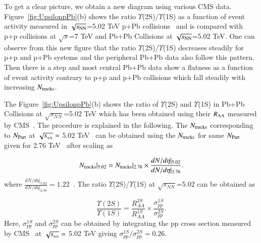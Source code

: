 To get a clear picture, we obtain a new diagram using various CMS data.
Figure~\ref{fig:UpsilonpPb}(b) shows the ratio $\Upsilon$(2S)/$\Upsilon$(1S) as a function of
event activity measured in $\sqrt{s_{\rm NN}}$=5.02 TeV p+Pb collisions~\cite{CMS:2013jsu}
and is compared with p+p collisions at $\sqrt{s}$=7 TeV \cite{CMS:2020fae} and
Pb+Pb Collisions at $\sqrt{s_{\rm NN}}$=5.02 TeV. One can observe from this new figure
that the ratio $\Upsilon$(2S)/$\Upsilon$(1S) decreases steadily for p+p and p+Pb systems
and the peripheral Pb+Pb data also follow this pattern. Then there is a step and most central Pb+Pb
data show a flatness as a function of event activity contrary to p+p and
p+Pb collisions which fall steadily with increasing $N_{\rm tracks}$.

The  Figure~\ref{fig:UpsilonpPb}(b) shows the ratio of $\Upsilon$(2S)
and $\Upsilon$(1S) in Pb+Pb Collisions at
$\sqrt{s_{NN}}$=5.02 TeV which has been obtained using their $R_{\rm AA}$ measured by
CMS~\cite{CMS:2022wfi}. The procedure is explained in the following.
The $N_{\rm tracks}$ corresponding to $N_{\rm Part}$ at $\sqrt{s_{_{NN}}} =$ 5.02 TeV~\cite{CMS:2018zza}
can be obtained using the $N_{\rm tracks}$ for same $N_{\rm Part}$ given
for 2.76 TeV~\cite{CMS:2013jsu} after scaling as

\begin{equation}
N_{\rm tracks}|_{5.02} =  N_{\rm tracks}|_{2.76} \times \frac{dN/d\eta |_{5.02}} {dN/d\eta|_{2.76}}.
\end{equation}
where $\frac{dN/d\eta |_{5.02}} {dN/d\eta|_{2.76}}=1.22$~\cite{CMS:2018zza,CMS:2013jsu}.
The ratio $\Upsilon$(2S)/$\Upsilon$(1S) at $\sqrt{s_{NN}}$=5.02 can be obtained as 

\begin{equation}
\frac{\Upsilon(2S)}{\Upsilon(1S)} = \frac{R_{AA}^{2S}}{R_{AA}^{1S}} \times \frac{\sigma_{pp}^{1S}}{\sigma_{pp}^{2S}}.
\end{equation}
Here, $\sigma_{pp}^{1S}$ and $\sigma_{pp}^{2S}$ can be obtained by integrating the pp cross section
measured by CMS~\cite{CMS:2013jsu} at $\sqrt{s_{_{NN}}} =$ 5.02 TeV giving $\sigma_{pp}^{1S}/\sigma_{pp}^{2S}=0.26$.





